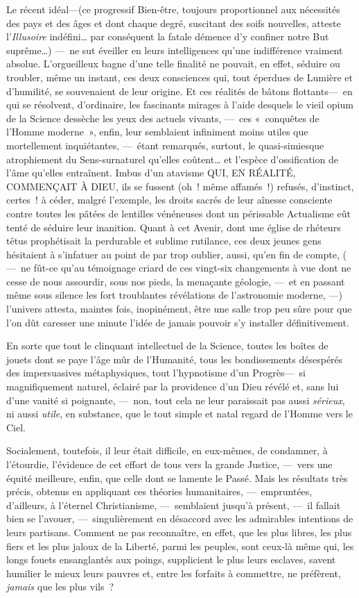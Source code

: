 \documentclass[french,twoside]{book} %
\begin{document}
Le récent idéal—(ce progressif Bien-être, toujours proportionnel aux nécessités des pays et des âges et dont chaque degré, suscitant des soifs nouvelles, atteste l’\emph{Illusoire} indéfini… par conséquent la fatale démence d’y confiner notre But suprême…) — ne sut éveiller en leurs intelligences   qu’une indifférence vraiment absolue. L’orgueilleux bagne d’une telle finalité ne pouvait, en effet, séduire ou troubler, même un instant, ces deux consciences qui, tout éperdues de Lumière et d’humilité, se souvenaient de leur origine. Et ces réalités de bâtons flottants— en qui se résolvent, d’ordinaire, les fascinants mirages à l’aide desquels le vieil opium de la Science dessèche les yeux des actuels vivants, — ces « conquêtes de l’Homme moderne », enfin, leur semblaient infiniment moins utiles que mortellement inquiétantes, — étant remarqués, surtout, le quasi-simiesque atrophiement du Sens-surnaturel qu’elles coûtent… et l’espèce d’ossification de l’âme qu’elles entraînent. Imbus d’un atavisme QUI, EN RÉALITÉ, COMMENÇAIT À DIEU, ils se fussent (oh ! même affamés !) refusés, d’instinct, certes ! à céder, malgré l’exemple, les droits sacrés de leur aînesse consciente contre toutes les pâtées de lentilles vénéneuses dont un périssable Actualisme eût tenté de séduire leur inanition. Quant à cet Avenir, dont une église de rhéteurs têtus prophétisait la perdurable et   sublime rutilance, ces deux jeunes gens hésitaient à s’infatuer au point de par trop oublier, aussi, qu’en fin de compte, ( — ne fût-ce qu’au témoignage criard de ces vingt-six changements à vue dont ne cesse de nous assourdir, sous nos pieds, la menaçante géologie, — et en passant même sous silence les fort troublantes révélations de l’astronomie moderne, —) l’univers attesta, maintes fois, inopinément, être une salle trop peu sûre pour que l’on dût caresser une minute l’idée de jamais pouvoir s’y installer définitivement.\par
En sorte que tout le clinquant intellectuel de la Science, toutes les boîtes de jouets dont se paye l’âge mûr de l’Humanité, tous les bondissements désespérés des impersuasives métaphysiques, tout l’hypnotisme d’un Progrès— si magnifiquement naturel, éclairé par la providence d’un Dieu révélé et, sans lui d’une vanité si poignante, — non, tout cela ne leur paraissait pas aussi \emph{sérieux}, ni aussi \emph{utile}, en substance, que le tout simple et natal regard de l’Homme vers le Ciel.\par
   Socialement, toutefois, il leur était difficile, en eux-mêmes, de condamner, à l’étourdie, l’évidence de cet effort de tous vers la grande Justice, — vers une équité meilleure, enfin, que celle dont se lamente le Passé. Mais les résultats très précis, obtenus en appliquant ces théories humanitaires, — empruntées, d’ailleurs, à l’éternel Christianisme, — semblaient jusqu’à présent, — il fallait bien se l’avouer, — singulièrement en désaccord avec les admirables intentions de leurs partisans. Comment ne pas reconnaître, en effet, que les plus libres, les plus fiers et les plus jaloux de la Liberté, parmi les peuples, sont ceux-là même qui, les longs fouets ensanglantés aux poings, supplicient le plus leurs esclaves, savent humilier le mieux leurs pauvres et, entre les forfaits à commettre, ne préfèrent, \emph{jamais} que les plus vils ?\par
\end{document}
